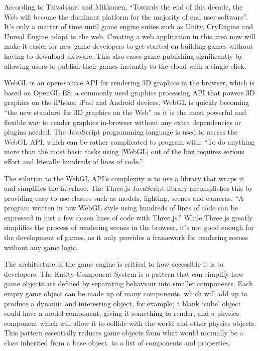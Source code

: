\documentclass[a4paper, 12pt]{article}
\begin{document}
According to Taivalsaari and Mikkonen, ``Towards the end of this decade, the Web will become the dominant platform for the majority of 
end user software''.\cite{6068340} It's only a matter of time until game engine suites such as Unity\cite{unity}, CryEngine\cite{cryengine} and Unreal Engine\cite{unreal} adapt to the web. Creating a web application in this area now will make it easier for new game developers to get started on building games without having to download software. This also eases game publishing significantly by allowing users to publish their games instantly to the cloud with a single click.

WebGL is an open-source API for rendering 3D graphics in the browser, which is based on OpenGL ES; a commonly used graphics processing API that powers 3D graphics on the iPhone, iPad and Android devices.\cite{parisi2012webgl} WebGL is quickly becoming ``the new standard for 3D graphics on the Web''\cite[p2]{parisi2012webgl} as it is the most powerful and flexible way to render graphics in-browser without any extra dependencies or plugins needed. The JavaScript programming language is used to access the WebGL API, which can be rather complicated to program with; ``To do anything more than the most basic tasks using [WebGL] out of the box requires serious effort and literally hundreds of lines of code.''\cite[p44]{parisi2014programming}

The solution to the WebGL API's complexity is to use a library that wraps it and simplifies the interface. The Three.js\cite{threejs} JavaScript library accomplishes this by providing easy to use classes such as models, lighting, scenes and cameras. ``A program written in raw WebGL style using hundreds of lines of code can be expressed in just a few dozen lines of code with Three.js.''\cite[p57]{parisi2014programming} While Three.js greatly simplifies the process of rendering scenes in the browser, it's not good enough for the development of games, as it only provides a framework for rendering scenes without any game logic.

The architecture of the game engine is critical to how accessible it is to developers. The Entity-Component-System is a pattern that can simplify how game objects are defined by separating behaviour into smaller components. Each empty game object can be made up of many components, which will add up to produce a dynamic and interesting object, for example; a blank `cube' object could have a model component, giving it something to render, and a physics component which will allow it to collide with the world and other physics objects.\cite{gregory2014game} This pattern essentially reduces game objects from what would normally be a class inherited from a base object, to a list of components and properties.
\end{document}
